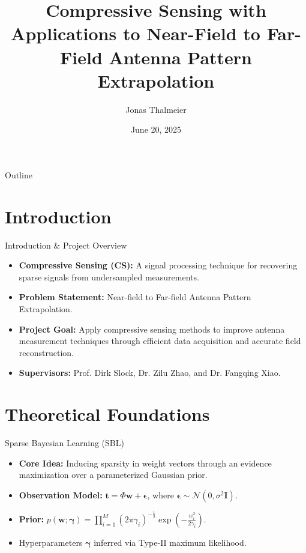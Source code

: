 \documentclass{beamer}
\title{Compressive Sensing with Applications to Near-Field to Far-Field Antenna Pattern Extrapolation}
\author{Jonas Thalmeier}
\institute{EURECOM}
\date{June 20, 2025}
\begin{document}
\begin{frame}
    \titlepage
\end{frame}

\begin{frame}{Outline}
    \tableofcontents
\end{frame}

\section{Introduction}
\begin{frame}{Introduction & Project Overview}
    \begin{itemize}
        \item \textbf{Compressive Sensing (CS):} A signal processing technique for recovering sparse signals from undersampled measurements. 
        \item \textbf{Problem Statement:} Near-field to Far-field Antenna Pattern Extrapolation.
        \item \textbf{Project Goal:} Apply compressive sensing methods to improve antenna measurement techniques through efficient data acquisition and accurate field reconstruction. 
        \item \textbf{Supervisors:} Prof. Dirk Slock, Dr. Zilu Zhao, and Dr. Fangqing Xiao. 
    \end{itemize}
\end{frame}

\section{Theoretical Foundations}
\begin{frame}{Sparse Bayesian Learning (SBL)}
    \begin{itemize}
        \item \textbf{Core Idea:} Inducing sparsity in weight vectors through an evidence maximization over a parameterized Gaussian prior. 
        \item \textbf{Observation Model:} $\mathbf{t} = \Phi \mathbf{w} + \boldsymbol{\epsilon}$, where $\boldsymbol{\epsilon} \sim \mathcal{N}(0, \sigma^2 \mathbf{I})$. 
        \item \textbf{Prior:} $p(\mathbf{w} ; \boldsymbol{\gamma}) =\prod\limits^M_{i=1}(2\pi\gamma_i)^{-\frac{1}{2}}\exp (-\frac{w_i^2}{2\gamma_i})$. 
        \item Hyperparameters $\boldsymbol{\gamma}$ inferred via Type-II maximum likelihood. 
    \end{itemize}
\end{frame}
\end{document}
